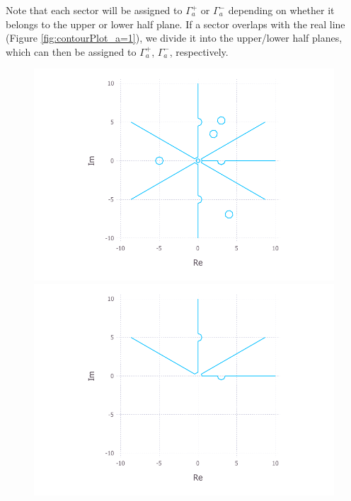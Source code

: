 \documentclass[11pt, oneside, a4paper]{article}
\begin{document}
Note that each sector will be assigned to $\Gamma_a^+$ or $\Gamma_a^-$ depending on whether it belongs to the upper or lower half plane. If a sector overlaps with the real line (Figure \ref{fig:contourPlot_a=1}), we divide it into the upper/lower half planes, which can then be assigned to $\Gamma_a^+$, $\Gamma_a^-$, respectively.
\begin{figure}[htpb!]
      \includegraphics[width=\linewidth]{contourPlot_a=1_n=3.pdf}
    \endminipage\hfill
      \includegraphics[width=\linewidth]{contourPlot_a=1_n=3_upper.pdf}
    \endminipage\hfill

\end{figure}
\end{document}
